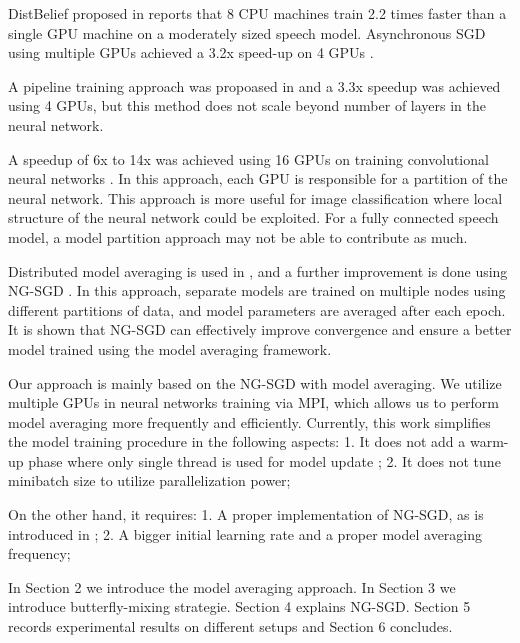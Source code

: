 \documentclass{article}
\begin{document}
DistBelief proposed in \cite{dean2012large} reports that 8 CPU machines train 2.2 times faster than a single GPU machine on a
moderately sized speech model. Asynchronous SGD using multiple GPUs achieved a 3.2x speed-up on 4 GPUs \cite{zhang2013asynchronous}.

A pipeline training approach was propoased in \cite{chen2012pipelined} and a 3.3x speedup was achieved using 4 GPUs, but this
method does not scale beyond number of layers in the neural network.

A speedup of 6x to 14x was achieved using 16 GPUs on training convolutional neural networks \cite{coates2013deep}. In this approach,
each GPU is responsible for a partition of the neural network. This approach is more useful for image classification where 
local structure of the neural network could be exploited. For a fully connected speech model, a model partition approach 
may not be able to contribute as much.

Distributed model averaging is used in \cite{zhang2014improving,miao2014distributed}, and a further improvement 
is done using NG-SGD \cite{povey2014parallel}. In this approach, separate models are trained on multiple nodes using 
different partitions of data, and model parameters are averaged after each epoch. It is shown that NG-SGD can effectively improve
convergence and ensure a better model trained using the model averaging framework.

Our approach is mainly based on the NG-SGD with model averaging. We utilize multiple GPUs in neural networks training via 
MPI, which allows us to perform model averaging more frequently and efficiently. Currently, this work simplifies the model 
training procedure in the following aspects:
1. It does not add a warm-up phase where only single thread is used for model update \cite{seide20141,povey2014parallel};
2. It does not tune minibatch size to utilize parallelization power;

On the other hand, it requires:
1. A proper implementation of NG-SGD, as is introduced in \cite{povey2014parallel};
2. A bigger initial learning rate and a proper model averaging frequency;

In Section 2 we introduce the model averaging approach. In Section 3 we introduce butterfly-mixing strategie. Section 4 
explains NG-SGD. Section 5 records experimental results on different setups and Section 6 concludes.
\end{document}
